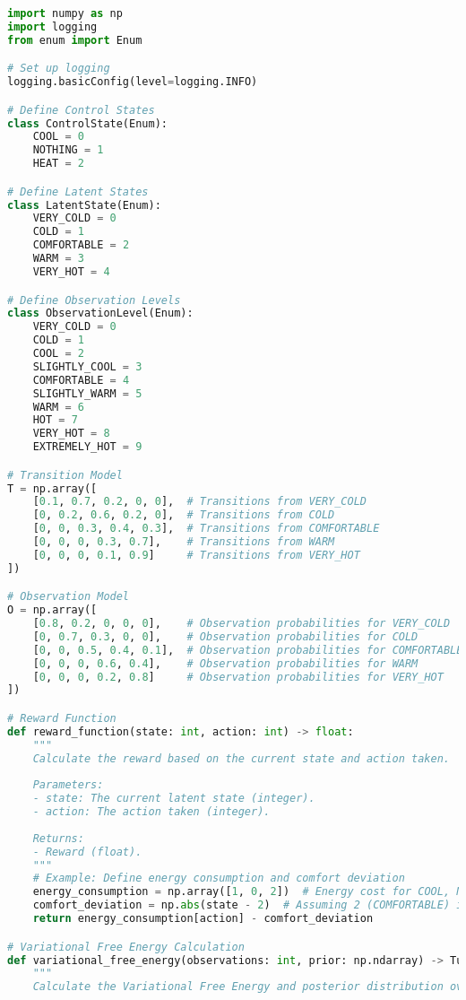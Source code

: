 \documentclass[11pt,a4paper]{article}
\begin{document}
\begin{lstlisting}[language=Python, caption={Full implementation code}]
import numpy as np
import logging
from enum import Enum

# Set up logging
logging.basicConfig(level=logging.INFO)

# Define Control States
class ControlState(Enum):
    COOL = 0
    NOTHING = 1
    HEAT = 2

# Define Latent States
class LatentState(Enum):
    VERY_COLD = 0
    COLD = 1
    COMFORTABLE = 2
    WARM = 3
    VERY_HOT = 4

# Define Observation Levels
class ObservationLevel(Enum):
    VERY_COLD = 0
    COLD = 1
    COOL = 2
    SLIGHTLY_COOL = 3
    COMFORTABLE = 4
    SLIGHTLY_WARM = 5
    WARM = 6
    HOT = 7
    VERY_HOT = 8
    EXTREMELY_HOT = 9

# Transition Model
T = np.array([
    [0.1, 0.7, 0.2, 0, 0],  # Transitions from VERY_COLD
    [0, 0.2, 0.6, 0.2, 0],  # Transitions from COLD
    [0, 0, 0.3, 0.4, 0.3],  # Transitions from COMFORTABLE
    [0, 0, 0, 0.3, 0.7],    # Transitions from WARM
    [0, 0, 0, 0.1, 0.9]     # Transitions from VERY_HOT
])

# Observation Model
O = np.array([
    [0.8, 0.2, 0, 0, 0],    # Observation probabilities for VERY_COLD
    [0, 0.7, 0.3, 0, 0],    # Observation probabilities for COLD
    [0, 0, 0.5, 0.4, 0.1],  # Observation probabilities for COMFORTABLE
    [0, 0, 0, 0.6, 0.4],    # Observation probabilities for WARM
    [0, 0, 0, 0.2, 0.8]     # Observation probabilities for VERY_HOT
])

# Reward Function
def reward_function(state: int, action: int) -> float:
    """
    Calculate the reward based on the current state and action taken.
    
    Parameters:
    - state: The current latent state (integer).
    - action: The action taken (integer).
    
    Returns:
    - Reward (float).
    """
    # Example: Define energy consumption and comfort deviation
    energy_consumption = np.array([1, 0, 2])  # Energy cost for COOL, NOTHING, HEAT
    comfort_deviation = np.abs(state - 2)  # Assuming 2 (COMFORTABLE) is the ideal state
    return energy_consumption[action] - comfort_deviation

# Variational Free Energy Calculation
def variational_free_energy(observations: int, prior: np.ndarray) -> Tuple[float, np.ndarray]:
    """
    Calculate the Variational Free Energy and posterior distribution over latent states.
    

\end{lstlisting}
\end{document}
